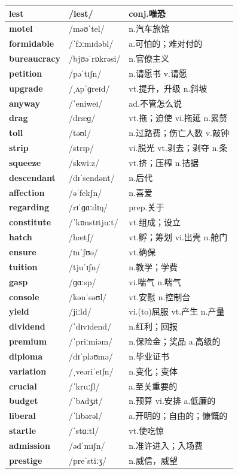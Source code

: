 \documentclass[14pt,a4paper]{extarticle}
\begin{document}
\begin{longtable}{ p{} p{} p{} }
\textbf{lest} & /lest/ & conj.唯恐 \\ \hline
\textbf{motel} & /məʊˈtel/ & n.汽车旅馆 \\ \hline
\textbf{formidable} & /ˈfɔːmɪdəbl/ & a.可怕的；难对付的 \\ \hline
\textbf{bureaucracy} & /bjʊəˈrɒkrəsi/ & n.官僚主义 \\ \hline
\textbf{petition} & /pəˈtɪʃn/ & n.请愿书 \quad v.请愿 \\ \hline
\textbf{upgrade} & /ˌʌpˈɡreɪd/ & vt.提升，升级 \quad n.斜坡 \\ \hline
\textbf{anyway} & /ˈeniweɪ/ & ad.不管怎么说 \\ \hline
\textbf{drag} & /dræɡ/ & vt.拖；迫使 \quad vi.拖延 \quad n.累赘 \\ \hline
\textbf{toll} & /təʊl/ & n.过路费；伤亡人数 \quad v.敲钟 \\ \hline
\textbf{strip} & /strɪp/ & vi.脱光 \quad vt.剥去；剥夺 \quad n.条 \\ \hline
\textbf{squeeze} & /skwiːz/ & vt.挤；压榨 \quad n.拮据 \\ \hline
\textbf{descendant} & /dɪˈsendənt/ & n.后代 \\ \hline
\textbf{affection} & /əˈfekʃn/ & n.喜爱 \\ \hline
\textbf{regarding} & /rɪˈɡɑːdɪŋ/ & prep.关于 \\ \hline
\textbf{constitute} & /ˈkɒnstɪtjuːt/ & vt.组成；设立 \\ \hline
\textbf{hatch} & /hætʃ/ & vt.孵；筹划 \quad vi.出壳 \quad n.舱门 \\ \hline
\textbf{ensure} & /ɪnˈʃʊə/ & vt.确保 \\ \hline
\textbf{tuition} & /tjuˈɪʃn/ & n.教学；学费 \\ \hline
\textbf{gasp} & /ɡɑːsp/ & vi.喘气 \quad n.喘气 \\ \hline
\textbf{console} & /kənˈsəʊl/ & vt.安慰 \quad n.控制台 \\ \hline
\textbf{yield} & /jiːld/ & vi.(to)屈服 \quad vt.产生 \quad n.产量 \\ \hline
\textbf{dividend} & /ˈdɪvɪdend/ & n.红利；回报 \\ \hline
\textbf{premium} & /ˈpriːmiəm/ & n.保险金；奖品 \quad a.高级的 \\ \hline
\textbf{diploma} & /dɪˈpləʊmə/ & n.毕业证书 \\ \hline
\textbf{variation} & /ˌveəriˈeɪʃn/ & n.变化；变体 \\ \hline
\textbf{crucial} & /ˈkruːʃl/ & a.至关重要的 \\ \hline
\textbf{budget} & /ˈbʌdʒɪt/ & n.预算 \quad vi.安排 \quad a.低廉的 \\ \hline
\textbf{liberal} & /ˈlɪbərəl/ & a.开明的；自由的；慷慨的 \\ \hline
\textbf{startle} & /ˈstɑːtl/ & vt.使吃惊 \\ \hline
\textbf{admission} & /ədˈmɪʃn/ & n.准许进入；入场费 \\ \hline
\textbf{prestige} & /preˈstiːʒ/ & n.威信，威望 \\ \hline
\end{longtable}
\end{document}
